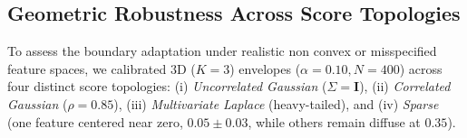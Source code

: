



\subsection{Geometric Robustness Across Score Topologies}
\label{sec5.1.3: distribution robustness}

To assess the boundary adaptation under realistic non convex or misspecified feature spaces, we calibrated 
$3\text{D}$ ($K=3$) envelopes ($\alpha = 0.10, N = 400$) across four distinct score topologies: (i) \emph{Uncorrelated 
Gaussian} ($\Sigma = \mathbf{I}$), (ii) \emph{Correlated Gaussian} ($\rho = 0.85$), (iii) \emph{Multivariate 
Laplace} (heavy-tailed), and (iv) \emph{Sparse} (one feature centered near zero, $0.05 \pm 0.03$, while others remain 
diffuse at $0.35$).

\begin{table}[htbp]
\centering
\caption{Geometric adaptation benchmark across $3\text{D}$ score topologies ($\alpha = 0.10, N = 400$). Both Radial ($M=150$) 
and Strip ($M_{\text{bin}}=12$) envelopes achieve exact nominal coverage under distributional misspecification.}
\label{tab: 3d topology results}
\end{table}


